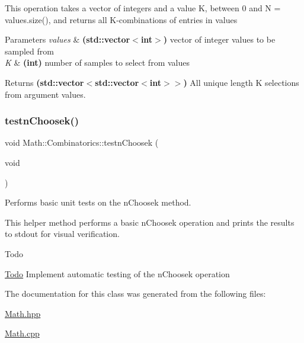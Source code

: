 This operation takes a vector of integers and a value K, between 0 and N = values.\+size(), and returns all K-\/combinations of entries in values 
\begin{DoxyParams}{Parameters}
{\em values} & {\bfseries (std\+::vector$<$int$>$)} vector of integer values to be sampled from \\
\hline
{\em K} & {\bfseries (int)} number of samples to select from values \\
\hline
\end{DoxyParams}
\begin{DoxyReturn}{Returns}
{\bfseries (std\+::vector$<$std\+::vector$<$int$>$$>$)} All unique length K selections from argument values. 
\end{DoxyReturn}
\mbox{\label{class_math_1_1_combinatorics_a174253b11651917aab46bc879449e59b}} 
\subsubsection{\texorpdfstring{testn\+Choosek()}{testnChoosek()}}
{\footnotesize\ttfamily void Math\+::\+Combinatorics\+::testn\+Choosek (\begin{DoxyParamCaption}\item[{void}]{ }\end{DoxyParamCaption})}



Performs basic unit tests on the n\+Choosek method. 

This helper method performs a basic n\+Choosek operation and prints the results to stdout for visual verification. \begin{DoxyRefDesc}{Todo}
\item[\mbox{\hyperlink{todo__todo000003}{Todo}}]Implement automatic testing of the n\+Choosek operation \end{DoxyRefDesc}


The documentation for this class was generated from the following files\+:\begin{DoxyCompactItemize}
\item 
\mbox{\hyperlink{_math_8hpp}{Math.\+hpp}}\item 
\mbox{\hyperlink{_math_8cpp}{Math.\+cpp}}\end{DoxyCompactItemize}
